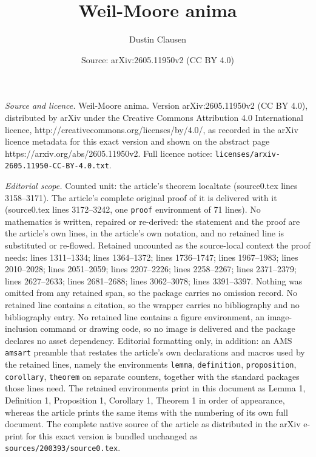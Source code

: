 \documentclass[10pt,a4paper]{amsart}
\title{Weil-Moore anima}
\author{Dustin Clausen}
\date{Source: arXiv:2605.11950v2 (CC BY 4.0)}
\begin{document}
\maketitle

\noindent\emph{Source and licence.} Weil-Moore anima. Version arXiv:2605.11950v2 (CC BY 4.0), distributed by arXiv under the Creative Commons Attribution 4.0 International licence, http://creativecommons.org/licenses/by/4.0/, as recorded in the arXiv licence metadata for this exact version and shown on the abstract page https://arxiv.org/abs/2605.11950v2. Full licence notice: \texttt{licenses/arxiv-2605.11950-CC-BY-4.0.txt}.\par\smallskip

\noindent\textit{Editorial scope.} Counted unit: the article's theorem localtate (source0.tex lines 3158--3171). The article's complete original proof of it is delivered with it (source0.tex lines 3172--3242, one \texttt{proof} environment of 71 lines). No mathematics is written, repaired or re-derived: the statement and the proof are the article's own lines, in the article's own notation, and no retained line is substituted or re-flowed.  Retained uncounted as the source-local context the proof needs: lines 1311--1334; lines 1364--1372; lines 1736--1747; lines 1967--1983; lines 2010--2028; lines 2051--2059; lines 2207--2226; lines 2258--2267; lines 2371--2379; lines 2627--2633; lines 2681--2688; lines 3062--3078; lines 3391--3397.  Nothing was omitted from any retained span, so the package carries no omission record.  No retained line contains a citation, so the wrapper carries no bibliography and no bibliography entry.  No retained line contains a figure environment, an image-inclusion command or drawing code, so no image is delivered and the package declares no asset dependency.  Editorial formatting only, in addition: an AMS \texttt{amsart} preamble that restates the article's own declarations and macros used by the retained lines, namely the environments \texttt{lemma}, \texttt{definition}, \texttt{proposition}, \texttt{corollary}, \texttt{theorem} on separate counters, together with the standard packages those lines need.  The retained environments print in this document as Lemma 1, Definition 1, Proposition 1, Corollary 1, Theorem 1 in order of appearance, whereas the article prints the same items with the numbering of its own full document.  The complete native source of the article as distributed in the arXiv e-print for this exact version is bundled unchanged as \texttt{sources/200393/source0.tex}.
\end{document}
